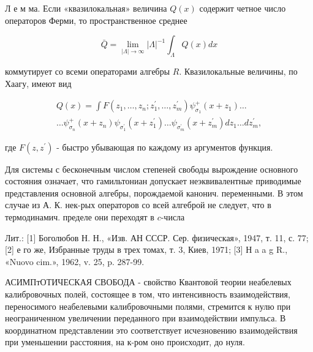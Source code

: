 \documentclass[10pt]{article}
\begin{document}
Л е м ма. Если «квазилокальная» величина $Q(x)$ содержит четное число операторов Ферми, то пространственное среднее



\[

\bar{Q}=\lim _{|\Lambda| \rightarrow \infty}|\Lambda|^{-1} \int_{\Lambda} Q(x) d x

\]



коммутирует со всеми операторами алгебры $R$. Квазилокальные величины, по Хаагу, имеют вид



\[

\begin{gathered}

Q(x)=\int F\left(z_{1}, \ldots, z_{n} ; z_{1}^{\prime}, \ldots, z_{m}^{\prime}\right) \psi_{\sigma_{1}}^{+}\left(x+z_{1}\right) \ldots \\

\ldots \psi_{\sigma_{n}}^{+}\left(x+z_{n}\right) \psi_{\sigma_{1}^{\prime}}\left(x+z_{1}^{\prime}\right) \ldots \psi_{\sigma_{m}^{\prime}}\left(x+z_{m}^{\prime}\right) d z_{1} \ldots d z_{m}^{\prime},

\end{gathered}

\]



где $F\left(z, z^{\prime}\right)$ - быстро убывающая по каждому из аргументов функция.



Для системы с бесконечным числом степеней свободы вырождение основного состояния означает, что гамильтониан допускает неэквивалентные приводимые представления основной алгебры, порождаемой канонич. переменными. В этом случае из А. К. нек-рых операторов со всей алгеброй не следует, что в термодинамич. пределе они переходят в $c$-числа



Лит.: [1] Боголюбов Н. Н., «Изв. АН СССР. Сер. физическая», 1947, т. 11, с. 77; [2] е го же, Избранные труды в трех томах, т. 3, Киев, 1971; [3] Н a a g R., «Nuovo cim.», 1962, v. 25, p. 287-99.



АСИМПтОТИЧЕСКАЯ СВОБОДА - свойство Квантовой теории неабелевых калибровочных полей, состоящее в том, что интенсивность взаимодействия, переносимого неабелевыми калибровочными полями, стремится к нулю при неограниченном увеличении переданного при взаимодействии импульса. В координатном представлении это соответствует исчезновению взаимодействия при уменьшении расстояния, на к-ром оно происходит, до нуля.
\end{document}
